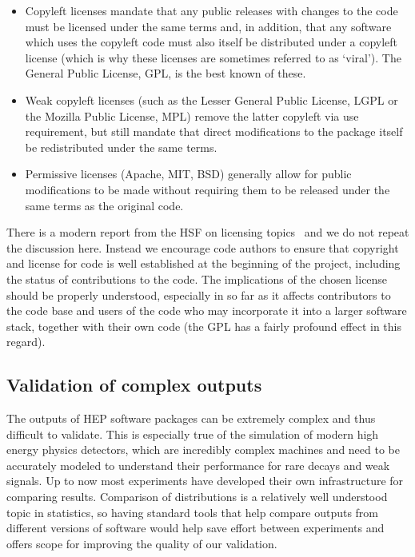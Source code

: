 \documentclass[12pt,a4paper]{article}
\begin{document}
\begin{itemize}
\item
    Copyleft licenses mandate that any public releases with changes to the
  code must be licensed under the same terms and, in addition, that any
  software which uses the copyleft code must also itself be distributed
  under a copyleft license (which is why these licenses are sometimes
  referred to as `viral'). The General Public License, GPL, is the best
  known of these.
  \item
    Weak copyleft licenses (such as the Lesser General Public License,
  LGPL or the Mozilla Public License, MPL) remove the latter copyleft
  via use requirement, but still mandate that direct modifications to
  the package itself be redistributed under the same terms.
  \item
    Permissive licenses (Apache, MIT, BSD) generally allow for public
  modifications to be made without requiring them to be released under
  the same terms as the original code.
\end{itemize}

There is a modern report from the HSF on licensing 
topics~\cite{HSF-TN-2016-01} and we do not
repeat the discussion here. Instead we encourage code authors to ensure
that copyright and license for code is well established at the beginning
of the project, including the status of contributions to the code. The
implications of the chosen license should be properly understood,
especially in so far as it affects contributors to the code base and
users of the code who may incorporate it into a larger software stack,
together with their own code (the GPL has a fairly profound effect in
this regard).

\hypertarget{validation-of-complex-outputs}{%
\subsection{Validation of complex
outputs}\label{validation-of-complex-outputs}}

The outputs of HEP software packages can be extremely complex and thus
difficult to validate. This is especially true of the simulation of
modern high energy physics detectors, which are incredibly complex
machines and need to be accurately modeled to understand their
performance for rare decays and weak signals. Up to now most experiments
have developed their own infrastructure for comparing results.
Comparison of distributions is a relatively well understood topic in
statistics, so having standard tools that help compare outputs from
different versions of software would help save effort between
experiments and offers scope for improving the quality of our
validation.
\end{document}
